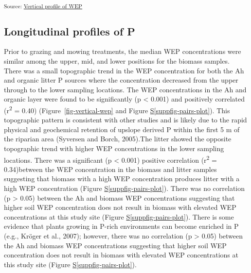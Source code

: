 \documentclass[
]{agujournal2019}
\newcommand*\quartosuppfigref[1]{Figure \hyperref[#1]{S\ref{#1}}}
\begin{document}
\textsubscript{Source:
\href{https://alex-koiter.github.io/riparian-grazing-manuscript/notebooks/04_Vertical_profile-preview.html\#cell-fig-vertical-WEP}{Vertical
profile of WEP}}

\subsection{Longitudinal profiles of
P}\label{longitudinal-profiles-of-p}

Prior to grazing and mowing treatments, the median WEP concentrations
were similar among the upper, mid, and lower positions for the biomass
samples. There was a small topographic trend in the WEP concentration
for both the Ah and organic litter P sources where the concentration
decreased from the upper through to the lower sampling locations. The
WEP concentrations in the Ah and organic layer were found to be
significantly (p \textless{} 0.001) and positively correlated
(r\textsuperscript{2} = 0.40) (Figure~\ref{fig-vertical-wep} and
\quartosuppfigref{suppfig-pairs-plot}). This topographic pattern is
consistent with other studies and is likely due to the rapid physical
and geochemical retention of upslope derived P within the first 5 m of
the riparian area (Syversen and Borch, 2005).The litter showed the
opposite topographic trend with higher WEP concentrations in the lower
sampling locations. There was a significant (p \textless{} 0.001)
positive correlation (r\textsuperscript{2} = 0.34)between the WEP
concentration in the biomass and litter samples suggesting that biomass
with a high WEP concentration produces litter with a high WEP
concentration (\quartosuppfigref{suppfig-pairs-plot}). There was no
correlation (p \textgreater{} 0.05) between the Ah and biomass WEP
concentrations suggesting that higher soil WEP concentration does not
result in biomass with elevated WEP concentrations at this study site
(\quartosuppfigref{suppfig-pairs-plot}). There is some evidence that
plants growing in P-rich environments can become enriched in P (e.g.,
Kröger et al., 2007); however, there was no correlation (p
\textgreater{} 0.05) between the Ah and biomass WEP concentrations
suggesting that higher soil WEP concentration does not result in biomass
with elevated WEP concentrations at this study site
(\quartosuppfigref{suppfig-pairs-plot}).
\end{document}
